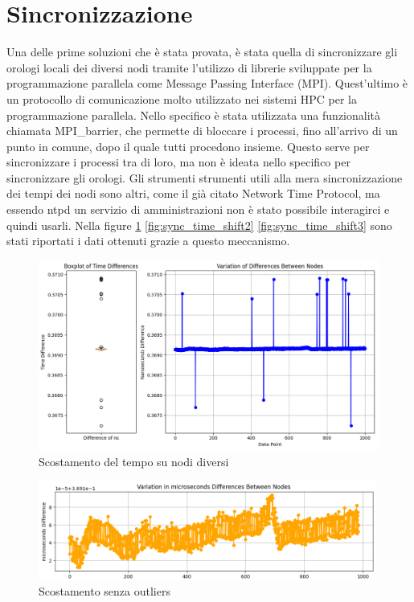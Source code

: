 \section{Sincronizzazione}\label{sec:timesync}
Una delle prime soluzioni che è stata provata, è stata quella di sincronizzare gli orologi locali dei diversi nodi tramite l'utilizzo di librerie sviluppate per la programmazione parallela come Message Passing Interface (MPI). Quest'ultimo è un protocollo di comunicazione molto utilizzato nei sistemi HPC per la programmazione parallela.
Nello specifico è stata utilizzata una funzionalità chiamata MPI\_barrier, che permette di bloccare i processi, fino all'arrivo di un punto in comune, dopo il quale tutti procedono insieme. Questo serve per sincronizzare i processi tra di loro, ma non è ideata nello specifico per sincronizzare gli orologi. Gli strumenti strumenti utili alla mera sincronizzazione dei tempi dei nodi sono altri, come il già citato Network Time Protocol,
ma essendo ntpd un servizio di amministrazioni non è stato possibile interagirci e quindi usarli. Nella figure \ref{fig:sync_time_shift1} \ref{fig:sync_time_shift2} \ref{fig:sync_time_shift3} sono stati riportati i dati ottenuti grazie a questo meccanismo.

\begin{figure}[H]
    \centering
    \includegraphics[width=\textwidth]{./results/time_sync_node.png}
    \caption{Scostamento del tempo su nodi diversi} %
    \label{fig:sync_time_shift1}
\end{figure}
\begin{figure}[H]
    \includegraphics[width=0.99\textwidth]{./results/time_shift_clean.png}
    \caption{Scostamento senza outliers}
    \label{fig:sync_diff_distr2}
\end{figure}

